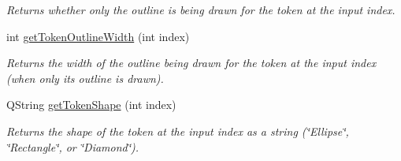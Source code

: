 \begin{DoxyCompactItemize}
\begin{DoxyCompactList}\small\item\em Returns whether only the outline is being drawn for the token at the input index. \end{DoxyCompactList}\item 
\hypertarget{class_picto_1_1_token_tray_graphic_a751d1bdbe3132540c509fa29d2d8e2fe}{int \hyperlink{class_picto_1_1_token_tray_graphic_a751d1bdbe3132540c509fa29d2d8e2fe}{get\-Token\-Outline\-Width} (int index)}\label{class_picto_1_1_token_tray_graphic_a751d1bdbe3132540c509fa29d2d8e2fe}

\begin{DoxyCompactList}\small\item\em Returns the width of the outline being drawn for the token at the input index (when only its outline is drawn). \end{DoxyCompactList}\item 
\hypertarget{class_picto_1_1_token_tray_graphic_a640010240952f73592df607fdd79dd00}{Q\-String \hyperlink{class_picto_1_1_token_tray_graphic_a640010240952f73592df607fdd79dd00}{get\-Token\-Shape} (int index)}\label{class_picto_1_1_token_tray_graphic_a640010240952f73592df607fdd79dd00}

\begin{DoxyCompactList}\small\item\em Returns the shape of the token at the input index as a string (\char`\"{}\-Ellipse\char`\"{}, \char`\"{}\-Rectangle\char`\"{}, or \char`\"{}\-Diamond\char`\"{}). \end{DoxyCompactList}\end{DoxyCompactItemize}
